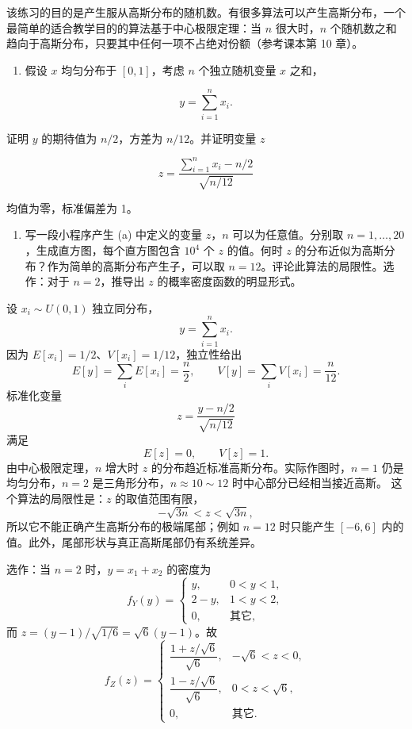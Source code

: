 \begin{question}
该练习的目的是产生服从高斯分布的随机数。有很多算法可以产生高斯分布，一个最简单的适合教学目的的算法基于中心极限定理：当
\(n\) 很大时，\(n\)
个随机数之和趋向于高斯分布，只要其中任何一项不占绝对份额（参考课本第 10
章）。

\begin{enumerate}
\item
  假设 \(x\) 均匀分布于 \([0,1]\)，考虑 \(n\) 个独立随机变量 \(x\)
  之和，
\end{enumerate}

\[
y=\sum_{i=1}^{n}x_i.
\]

证明 \(y\) 的期待值为 \(n/2\)，方差为 \(n/12\)。并证明变量 \(z\)

\[
z=\frac{\sum_{i=1}^{n}x_i-n/2}{\sqrt{n/12}}
\]

均值为零，标准偏差为 1。

\begin{enumerate}[start=2]
\item
  写一段小程序产生 (a) 中定义的变量 \(z\)，\(n\) 可以为任意值。分别取
  \(n=1,\ldots,20\)，生成直方图，每个直方图包含 \(10^4\) 个 \(z\)
  的值。何时 \(z\)
  的分布近似为高斯分布？作为简单的高斯分布产生子，可以取
  \(n=12\)。评论此算法的局限性。选作：对于 \(n=2\)，推导出 \(z\)
  的概率密度函数的明显形式。
\end{enumerate}
\begin{solution}
设 \(x_i\sim U(0,1)\) 独立同分布，
\[
y=\sum_{i=1}^n x_i.
\]
因为 \(E[x_i]=1/2\)、\(V[x_i]=1/12\)，独立性给出
\[
E[y]=\sum_i E[x_i]=\frac n2,
\qquad
V[y]=\sum_i V[x_i]=\frac n{12}.
\]
标准化变量
\[
z=\frac{y-n/2}{\sqrt{n/12}}
\]
满足
\[
E[z]=0,
\qquad
V[z]=1.
\]
由中心极限定理，\(n\) 增大时 \(z\) 的分布趋近标准高斯分布。实际作图时，\(n=1\)
仍是均匀分布，\(n=2\) 是三角形分布，\(n\approx 10\sim12\) 时中心部分已经相当接近高斯。
这个算法的局限性是：\(z\) 的取值范围有限，
\[
-\sqrt{3n}<z<\sqrt{3n},
\]
所以它不能正确产生高斯分布的极端尾部；例如 \(n=12\) 时只能产生 \([-6,6]\)
内的值。此外，尾部形状与真正高斯尾部仍有系统差异。

选作：当 \(n=2\) 时，\(y=x_1+x_2\) 的密度为
\[
f_Y(y)=
\begin{cases}
y,&0<y<1,\\
2-y,&1<y<2,\\
0,&\text{其它},
\end{cases}
\]
而 \(z=(y-1)/\sqrt{1/6}=\sqrt6(y-1)\)。故
\[
f_Z(z)=
\begin{cases}
\dfrac{1+z/\sqrt6}{\sqrt6},&-\sqrt6<z<0,\\[4pt]
\dfrac{1-z/\sqrt6}{\sqrt6},&0<z<\sqrt6,\\[4pt]
0,&\text{其它}.
\end{cases}
\]
\end{solution}
\end{question}


